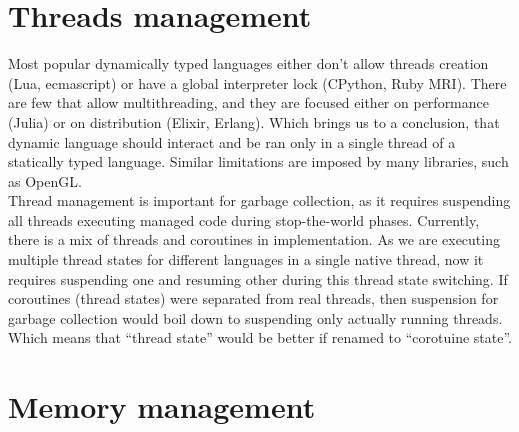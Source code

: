 \documentclass[times, %
			   specification,annotation, %
			   titlepage-extra-ru,specification-extra-ru,annotation-extra-ru, %
			   languages={russian,english} %
			  ]{itmo-student-thesis}
\begin{document}
\section{Threads management}
Most popular dynamically typed languages either don't allow threads creation (Lua, ecmascript) or have a global interpreter lock (CPython, Ruby MRI). There are few that allow multithreading, and they are focused either on performance (Julia) or on distribution (Elixir, Erlang). Which brings us to a conclusion, that dynamic language should interact and be ran only in a single thread of a statically typed language. Similar limitations are imposed by many libraries, such as OpenGL.\\
Thread management is important for garbage collection, as it requires suspending all threads executing managed code during stop-the-world phases. Currently, there is a mix of threads and coroutines in implementation. As we are executing multiple thread states for different languages in a single native thread, now it requires suspending one and resuming other during this thread state switching. If coroutines (thread states) were separated from real threads, then suspension for garbage collection would boil down to suspending only actually running threads. Which means that ``thread state'' would be better if renamed to ``corotuine state''.

\section{Memory management}
\end{document}
